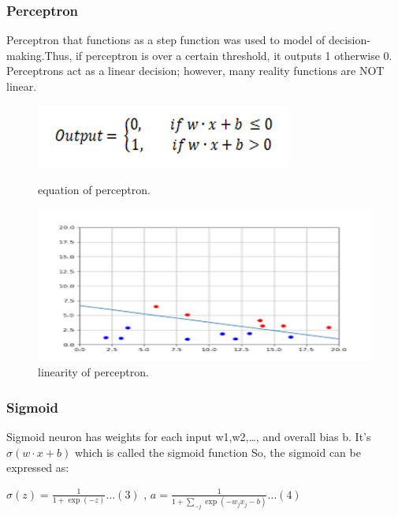 \documentclass{article}
\begin{document}
\subsubsection{Perceptron}
Perceptron that functions as a step function was used to model of decision-making.Thus, if perceptron is over a certain threshold, it outputs 1 otherwise 0.
Perceptrons act as a linear decision; however, many reality functions are NOT linear.
\begin{figure}[H]
  \centering
  \begin{minipage}[b]{0.4\textwidth}
    \includegraphics[width=\textwidth]{img/percept.png}
    \caption{equation of perceptron.}
  \end{minipage}
  \hfill
  \begin{minipage}[b]{0.5\textwidth}
    \includegraphics[width=\textwidth]{img/percept2.png}
    \caption{linearity of perceptron.\protect\cite{Percept}}
  \end{minipage}
\end{figure}

\subsubsection{Sigmoid}
Sigmoid neuron has weights for each input w1,w2,\dots , and overall bias b. 
It’s $\sigma{(w \cdot x+b)}$ which is called the sigmoid function
So, the sigmoid can be expressed as:

$\sigma{(z)} =\frac{1}{1+\exp(-z)} \dots (3)$ 
, $a =\frac{1}{1+\sum_{-j}\exp(-w_jx_j-b)} \dots  (4) $
\end{document}
